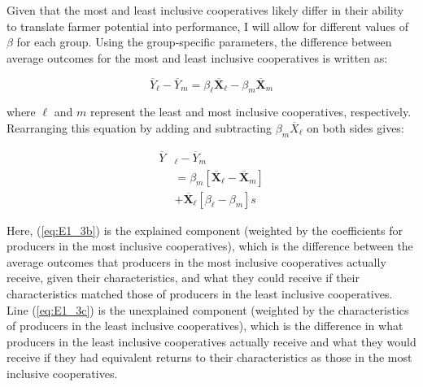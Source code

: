 \documentclass[11pt]{article}
\begin{document}
Given that the most and least inclusive cooperatives likely differ in their ability to translate farmer potential into performance, I will allow for different values of $\beta$ for each group. Using the group-specific parameters, the difference between average outcomes for the most and least inclusive cooperatives is written as:

\begin{equation} \label{eq:E1_2}
        \overline{Y}_{\ell} - \overline{Y}_{m} =  \beta_{\ell}\overline{\mathbf{X}}_{\ell} - \beta_{m}\overline{\mathbf{X}}_{m}
\end{equation}  

where $\ell$ and $m$ represent the least and most inclusive cooperatives, respectively. Rearranging this equation by adding and subtracting $\beta_{m}\overline{X}_{\ell}$ on both sides gives:

\begin{subequations}
    \begin{align}
        \overline{Y}&_{\ell} - \overline{Y}_{m} \label{eq:E1_3a} \\
                &= \beta_{m}[\overline{\mathbf{X}}_{\ell} - \overline{\mathbf{X}}_{m}] \label{eq:E1_3b} \\
                &+ \overline{\mathbf{X}}_{\ell}[\beta_{\ell} - \beta_{m}] \label{eq:E1_3c}s
    \end{align}
\end{subequations}  

Here, (\ref{eq:E1_3b}) is the explained component (weighted by the coefficients for producers in the most inclusive cooperatives), which is the difference between the average outcomes that producers in the most inclusive cooperatives actually receive, given their characteristics, and what they could receive if their characteristics matched those of producers in the least inclusive cooperatives. %
Line (\ref{eq:E1_3c}) is the unexplained component (weighted by the characteristics of producers in the least inclusive cooperatives), which is the difference in what producers in the least inclusive cooperatives actually receive and what they would receive if they had equivalent returns to their characteristics as those in the most inclusive cooperatives.
\end{document}
